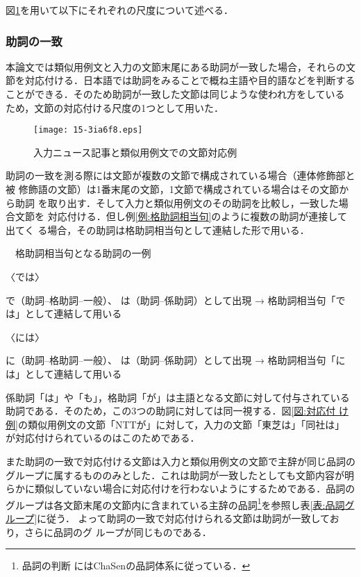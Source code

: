\documentclass[japanese]{jnlp_1.4}
\newcounter{exp}
\def\exp#1{}
\def\toolref#1{}
\begin{document}
図\ref{図:対応付け例}を用いて以下にそれぞれの尺度について述べる．


\subsubsection{助詞の一致}

本論文では類似用例文と入力の文節末尾にある助詞が一致した場合，それらの文
節を対応付ける．日本語では助詞をみることで概ね主語や目的語などを判断する
ことができる．そのため助詞が一致した文節は同じような使われ方をしている
ため，文節の対応付ける尺度の1つとして用いた．

\begin{figure}[t]
\begin{center}
\texttt{[image: 15-3ia6f8.eps]}
 \caption{入力ニュース記事と類似用例文での文節対応例} \label{図:対応付け例}
 \end{center}
\vspace{-1\baselineskip}
\end{figure}

助詞の一致を測る際には文節が複数の文節で構成されている場合（連体修飾部と被
修飾語の文節）は1番末尾の文節，1文節で構成されている場合はその文節から助詞
を取り出す．そして入力と類似用例文のその助詞を比較し，一致した場合文節を
対応付ける．但し例\ref{例:格助詞相当句}のように複数の助詞が連接して出てく
る場合，その助詞は格助詞相当句として連結した形で用いる．
\begin{screen}
\exp{例:格助詞相当句}　格助詞相当句となる助詞の一例

〈では〉

{\setlength{\leftskip}{2zw}
 で（助詞--格助詞--一般）、 は（助詞--係助詞）として出現  → 格助詞相当句「で
 は」として連結して用いる
\par}

〈には〉

{\setlength{\leftskip}{2zw}
 に（助詞--格助詞--一般）、 は（助詞--係助詞）として出現  → 格助詞相当句「に
 は」として連結して用いる
\par}
\end{screen}
係助詞「は」や「も」，格助詞「が」は主語となる文節に対して付与されている
助詞である．そのため，この3つの助詞に対しては同一視する．図\ref{図:対応付
け例}の類似用例文の文節「NTTが」に対して，入力の文節「東芝は」「同社は」
が対応付けられているのはこのためである．

また助詞の一致で対応付ける文節は入力と類似用例文の文節で主辞が同じ品詞の
グループに属するもののみとした．これは助詞が一致したとしても文節内容が明
らかに類似していない場合に対応付けを行わないようにするためである．品詞の
グループは各文節末尾の文節内に含まれている主辞の品詞\footnote{品詞の判断
にはChaSen\toolref{ツール:chasen}の品詞体系に従っている．}を参照し表\ref{表:品詞グループ}に従う．
よって助詞の一致で対応付けられる文節は助詞が一致しており，さらに品詞のグ
ループが同じものである．
\end{document}
